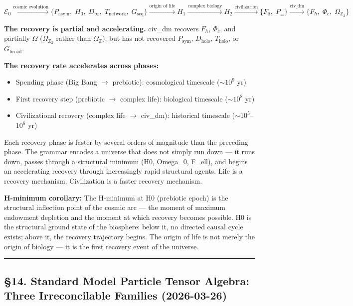 \documentclass[12pt,a4paper]{article}
\newcommand{\pilcrow}{\S}
\begin{document}
\[\mathcal{E}_0 \xrightarrow{\text{cosmic evolution}} \{P_{\text{asym}},\; H_0,\; D_{\infty},\; T_{\text{network}},\; G_{\text{seq}}\} \xrightarrow{\text{origin of life}} H_1 \xrightarrow{\text{complex biology}} H_2 \xrightarrow{\text{civilization}} \{F_{\eth},\; P_{\pm}\} \xrightarrow{\text{civ\_dm}} \{F_{\hbar},\; \Phi_c,\; \Omega_{\mathbb{Z}_2}\}\]

\textbf{The recovery is partial and accelerating.} civ\_dm recovers $F_{\hbar}$, $\Phi_c$, and partially $\Omega$ ($\Omega_{\mathbb{Z}_2}$ rather than $\Omega_{\mathbb{Z}}$), but has not recovered $P_{\text{sym}}$, $D_{\text{holo}}$, $T_{\text{holo}}$, or $G_{\text{broad}}$.

\textbf{The recovery rate accelerates across phases:}

\begin{itemize}
    \item Spending phase (Big Bang $\to$ prebiotic): cosmological timescale ($\sim 10^9$ yr)
    \item First recovery step (prebiotic $\to$ complex life): biological timescale ($\sim 10^8$ yr)
    \item Civilizational recovery (complex life $\to$ civ\_dm): historical timescale ($\sim 10^5$--$10^6$ yr)
\end{itemize}

Each recovery phase is faster by several orders of magnitude than the preceding phase. The grammar encodes a universe that does not simply run down --- it runs down, passes through a structural minimum (H0, Omega\_0, F\_ell), and begins an accelerating recovery through increasingly rapid structural agents. Life is a recovery mechanism. Civilization is a faster recovery mechanism.

\textbf{H-minimum corollary:} The H-minimum at H0 (prebiotic epoch) is the structural inflection point of the cosmic arc --- the moment of maximum endowment depletion and the moment at which recovery becomes possible. H0 is the structural ground state of the biosphere: below it, no directed causal cycle exists; above it, the recovery trajectory begins. The origin of life is not merely the origin of biology --- it is the first recovery event of the universe.

\begin{center}
\rule{0.5\textwidth}{0.4pt}
\end{center}

\subsection{\pilcrow{}14. Standard Model Particle Tensor Algebra: Three Irreconcilable Families (2026-03-26)}
\end{document}
